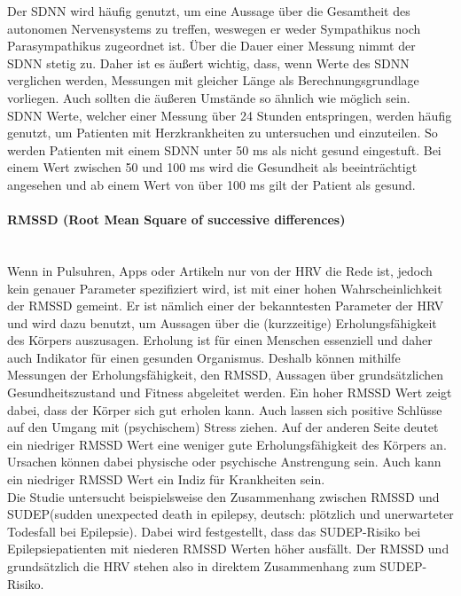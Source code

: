 Der SDNN wird häufig genutzt, um eine Aussage über die Gesamtheit des autonomen Nervensystems zu treffen, weswegen er weder Sympathikus noch Parasympathikus zugeordnet ist.\cite[S.22]{babilon}  Über die Dauer einer Messung nimmt der SDNN stetig zu. Daher ist es äußert wichtig, dass, wenn Werte des SDNN verglichen werden, Messungen mit gleicher Länge als Berechnungsgrundlage vorliegen. Auch sollten die äußeren Umstände so ähnlich wie möglich sein.\cite{zeit}\\
SDNN Werte, welcher einer Messung über 24 Stunden entspringen, werden häufig genutzt, um Patienten mit Herzkrankheiten zu untersuchen und einzuteilen. So werden Patienten mit einem SDNN unter 50 ms als nicht gesund eingestuft. Bei einem Wert zwischen 50 und 100 ms wird die Gesundheit als beeinträchtigt angesehen und ab einem Wert von über 100 ms gilt der Patient als gesund. \cite[S.4]{med}  

\paragraph{RMSSD (Root Mean Square of successive differences)}\mbox{} \\
Wenn in Pulsuhren, Apps oder Artikeln nur von der HRV die Rede ist, jedoch kein genauer Parameter spezifiziert wird, ist mit einer hohen Wahrscheinlichkeit der RMSSD gemeint. Er ist nämlich einer der bekanntesten Parameter der HRV und wird dazu benutzt, um Aussagen über die (kurzzeitige) Erholungsfähigkeit des Körpers auszusagen. Erholung ist für einen Menschen essenziell und daher auch Indikator für einen gesunden Organismus. Deshalb können mithilfe Messungen der Erholungsfähigkeit, den RMSSD, Aussagen über grundsätzlichen Gesundheitszustand und Fitness abgeleitet werden.
Ein hoher RMSSD Wert zeigt dabei, dass der Körper sich gut erholen kann. Auch lassen sich positive Schlüsse auf den Umgang mit (psychischem) Stress ziehen. 
Auf der anderen Seite deutet ein niedriger RMSSD Wert eine weniger gute Erholungsfähigkeit des Körpers an. Ursachen können dabei physische oder psychische Anstrengung sein. Auch kann ein niedriger RMSSD Wert ein Indiz für Krankheiten sein.\\
 Die Studie \cite{sudep} untersucht beispielsweise den Zusammenhang zwischen RMSSD und SUDEP(sudden unexpected death in epilepsy, deutsch: plötzlich und unerwarteter Todesfall bei Epilepsie). Dabei wird festgestellt, dass das SUDEP-Risiko bei Epilepsiepatienten mit niederen RMSSD Werten höher ausfällt. Der RMSSD und grundsätzlich die HRV stehen also in direktem Zusammenhang zum SUDEP-Risiko. 

